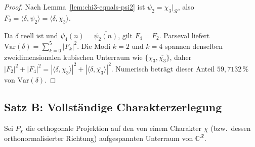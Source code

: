 \begin{proof}
Nach Lemma~\ref{lem:chi3-equals-psi2} ist $\psi_2 = \chi_3|_{\mathcal{R}}$,
also $F_2 = \langle\delta,\psi_2\rangle = \langle\delta,\chi_3\rangle$.

Da $\delta$ reell ist und $\psi_4(n)=\overline{\psi_2(n)}$, gilt
$F_4=\overline{F_2}$.
Parseval liefert $\mathrm{Var}(\delta)=\sum_{k=0}^{5}|F_k|^2$.
Die Modi $k=2$ und $k=4$ spannen denselben zweidimensionalen kubischen
Unterraum wie $\{\chi_3,\overline{\chi_3}\}$, daher
$|F_2|^2+|F_4|^2 = |\langle\delta,\chi_3\rangle|^2+|\langle\delta,\overline{\chi_3}\rangle|^2$.
Numerisch beträgt dieser Anteil $59{,}7132\,\%$ von $\mathrm{Var}(\delta)$.
\end{proof}

\subsection{Satz B: Vollständige Charakterzerlegung}

Sei $P_\chi$ die orthogonale Projektion auf den von einem Charakter
$\chi$ (bzw.\ dessen orthonormalisierter Richtung) aufgespannten
Unterraum von $\mathbb{C}^{\mathcal{R}}$.

